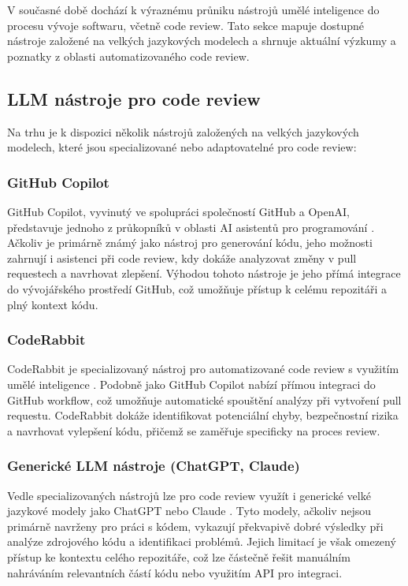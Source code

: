\documentclass[12pt, a4paper]{article}
\begin{document}
V současné době dochází k výraznému průniku nástrojů umělé inteligence do procesu vývoje softwaru, včetně code review. Tato sekce mapuje dostupné nástroje založené na velkých jazykových modelech a shrnuje aktuální výzkumy a poznatky z oblasti automatizovaného code review.

\subsection{LLM nástroje pro code review}

Na trhu je k dispozici několik nástrojů založených na velkých jazykových modelech, které jsou specializované nebo adaptovatelné pro code review:

\subsubsection{GitHub Copilot}
GitHub Copilot, vyvinutý ve spolupráci společností GitHub a OpenAI, představuje jednoho z průkopníků v oblasti AI asistentů pro programování \cite{copilot2023}. Ačkoliv je primárně známý jako nástroj pro generování kódu, jeho možnosti zahrnují i asistenci při code review, kdy dokáže analyzovat změny v pull requestech a navrhovat zlepšení. Výhodou tohoto nástroje je jeho přímá integrace do vývojářského prostředí GitHub, což umožňuje přístup k celému repozitáři a plný kontext kódu.

\subsubsection{CodeRabbit}
CodeRabbit je specializovaný nástroj pro automatizované code review s využitím umělé inteligence \cite{coderabbit2023}. Podobně jako GitHub Copilot nabízí přímou integraci do GitHub workflow, což umožňuje automatické spouštění analýzy při vytvoření pull requestu. CodeRabbit dokáže identifikovat potenciální chyby, bezpečnostní rizika a navrhovat vylepšení kódu, přičemž se zaměřuje specificky na proces review.

\subsubsection{Generické LLM nástroje (ChatGPT, Claude)}
Vedle specializovaných nástrojů lze pro code review využít i generické velké jazykové modely jako ChatGPT \cite{chatgpt2023} nebo Claude \cite{anthropic2023}. Tyto modely, ačkoliv nejsou primárně navrženy pro práci s kódem, vykazují překvapivě dobré výsledky při analýze zdrojového kódu a identifikaci problémů. Jejich limitací je však omezený přístup ke kontextu celého repozitáře, což lze částečně řešit manuálním nahráváním relevantních částí kódu nebo využitím API pro integraci.
\end{document}
